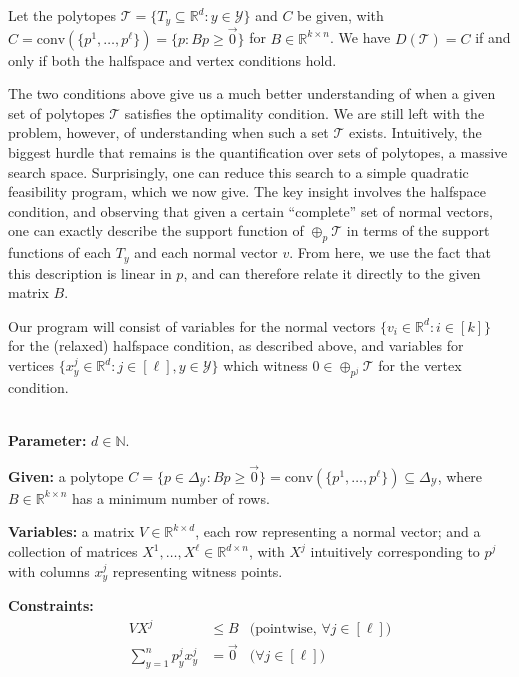 \documentclass[anon]{colt2020} %
\newcommand{\reals}{\mathbb{R}}
\newcommand{\simplex}{\Delta_\Y}
\newcommand{\T}{\mathcal{T}}
\newcommand{\Y}{\mathcal{Y}}
\newcommand{\conv}{\mathrm{conv}}
\begin{document}
\begin{theorem} \label{thm:vertex-halfspace-opt}
  Let the polytopes $\T = \{T_y \subseteq \reals^d : y \in \Y\}$ and $C$ be given, with $C = \conv(\{p^1,\ldots,p^{\ell}\}) = \{p: Bp \geq \vec 0\}$ for $B \in \reals^{k \times n}$.
  We have $D(\T) = C$ if and only if both the halfspace and vertex conditions hold.
\end{theorem}

The two conditions above give us a much better understanding of when a given set of polytopes $\T$ satisfies the optimality condition.
We are still left with the problem, however, of understanding when such a set $\T$ exists.
Intuitively, the biggest hurdle that remains is the quantification over sets of polytopes, a massive search space.
Surprisingly, one can reduce this search to a simple quadratic feasibility program, which we now give.
The key insight involves the halfspace condition, and observing that given a certain ``complete'' set of normal vectors, one can exactly describe the support function of $\oplus_p\T$ in terms of the support functions of each $T_y$ and each normal vector $v$.
From here, we use the fact that this description is linear in $p$, and can therefore relate it directly to the given matrix $B$.

Our program will consist of variables for the normal vectors $\{v_i \in \reals^d : i \in [k]\}$ for the (relaxed) halfspace condition, as described above, and variables for vertices $\{x^j_y \in \reals^d : j \in [\ell], y \in \Y\}$ which witness $0\in\oplus_{p^j} \T$ for the vertex condition.

\begin{definition} \label{def:qfp} ~ \\
  \indent \textbf{Parameter:} $d \in \mathbb{N}$.

  \textbf{Given:} a polytope $C = \{p \in \simplex : Bp \geq \vec 0\} = \conv(\{p^1, \ldots, p^\ell\}) \subseteq \simplex$, where $B \in \reals^{k \times n}$ has a minimum number of rows.

  \textbf{Variables:} a matrix $V \in \reals^{k \times d}$, each row representing a normal vector; and a collection of matrices $X^1,\ldots,X^{\ell} \in \reals^{d \times n}$, with $X^j$ intuitively corresponding to $p^j$ with columns $x^j_y$ representing witness points.

  \textbf{Constraints:}
    \begin{align}
      V X^j                     &\leq B    & \text{(pointwise, $\forall j \in [\ell]$)}  \label{eqn:qp-constr-1} \\
      \sum_{y=1}^n p^j_y x^j_y &= \vec 0  & \text{($\forall j \in [\ell]$)}    \label{eqn:qp-constr-2}
    \end{align}
\end{definition}
\end{document}
